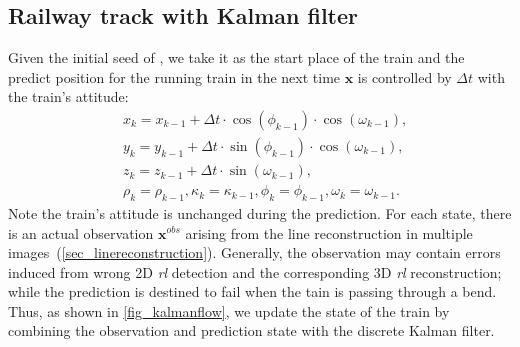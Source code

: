 \subsection{Railway track with Kalman filter}
Given the initial seed of \rlp,
we take it as the start place of the train and 
the predict position for the running train in the next time $\mathbf x$ is controlled by $\Delta t$ with the train's attitude:
\begin{equation}
        \begin{aligned}
            & x_k = x_{k-1} + \Delta t \cdot \cos(\phi_{k-1}) \cdot \cos(\omega_{k-1}), \\
            & y_k = y_{k-1} + \Delta t \cdot \sin(\phi_{k-1}) \cdot \cos(\omega_{k-1}), \\
            & z_k = z_{k-1} + \Delta t \cdot \sin(\omega_{k-1}),\\
            &\rho_k=\rho_{k-1},
        \kappa_k=\kappa_{k-1},
        \phi_k=\phi_{k-1},
        \omega_k=\omega_{k-1}.
        \end{aligned}
        \label {eq_statetransition}
\end{equation}
Note the train's attitude is unchanged during the prediction.
For each state,
there is an actual observation $\mathbf{x}^{obs}$ arising from the line reconstruction in multiple images~(\cref*{sec_linereconstruction}).
Generally,
the observation may contain errors induced from wrong 2D \textit{rl} detection and the corresponding 3D \textit{rl} reconstruction;
while the prediction is destined to fail when the tain is passing through a bend.
Thus,
as shown in \cref{fig_kalmanflow},
we update the state of the train by combining the observation and prediction state with the discrete Kalman filter.
